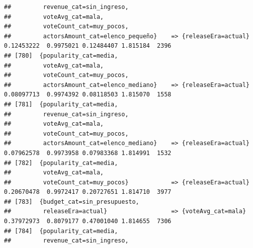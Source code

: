 \documentclass[
]{article}
\begin{document}
\begin{verbatim}
##         revenue_cat=sin_ingreso,                                                                                                
##         voteAvg_cat=mala,                                                                                                       
##         voteCount_cat=muy_pocos,                                                                                                
##         actorsAmount_cat=elenco_pequeño}    => {releaseEra=actual}               0.12453222  0.9975021 0.12484407 1.815184  2396
## [780]  {popularity_cat=media,                                                                                                   
##         voteAvg_cat=mala,                                                                                                       
##         voteCount_cat=muy_pocos,                                                                                                
##         actorsAmount_cat=elenco_mediano}    => {releaseEra=actual}               0.08097713  0.9974392 0.08118503 1.815070  1558
## [781]  {popularity_cat=media,                                                                                                   
##         revenue_cat=sin_ingreso,                                                                                                
##         voteAvg_cat=mala,                                                                                                       
##         voteCount_cat=muy_pocos,                                                                                                
##         actorsAmount_cat=elenco_mediano}    => {releaseEra=actual}               0.07962578  0.9973958 0.07983368 1.814991  1532
## [782]  {popularity_cat=media,                                                                                                   
##         voteAvg_cat=mala,                                                                                                       
##         voteCount_cat=muy_pocos}            => {releaseEra=actual}               0.20670478  0.9972417 0.20727651 1.814710  3977
## [783]  {budget_cat=sin_presupuesto,                                                                                             
##         releaseEra=actual}                  => {voteAvg_cat=mala}                0.37972973  0.8079177 0.47001040 1.814655  7306
## [784]  {popularity_cat=media,                                                                                                   
##         revenue_cat=sin_ingreso,                                                                                                

\end{verbatim}
\end{document}
